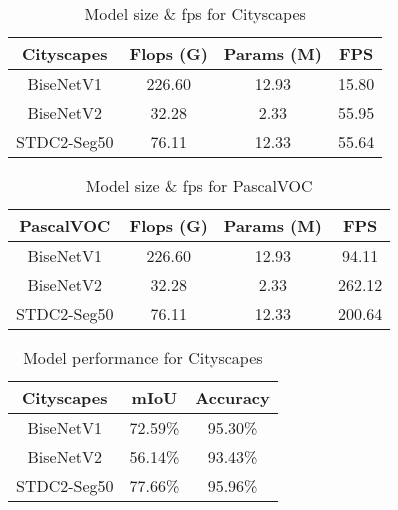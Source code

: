 \begin{table}[]
\centering
\begin{tabular}{cccc}
\hline
{\textbf{Cityscapes}}   & Flops (G)     & Params (M)    & FPS           \\ \hline
{BiseNetV1}             & 226.60        & 12.93         & 15.80         \\ \hline
{BiseNetV2}             & 32.28         & 2.33          & 55.95         \\ \hline
{STDC2-Seg50}           & 76.11         & 12.33         & 55.64         \\ \hline

\end{tabular}
\caption{Model size \& fps for Cityscapes}
\label{tab:parametersSTDC2}
\end{table}

\begin{table}[]
\centering
\begin{tabular}{cccc}
\hline
{\textbf{PascalVOC}}    & Flops (G)     & Params (M)    & FPS           \\ \hline
{BiseNetV1}             & 226.60        & 12.93         & 94.11         \\ \hline
{BiseNetV2}             & 32.28         & 2.33          & 262.12        \\ \hline
{STDC2-Seg50}           & 76.11         & 12.33         & 200.64        \\ \hline

\end{tabular}
\caption{Model size \& fps for PascalVOC}
\label{tab:parametersSTDC2}
\end{table}

\begin{table}[]
\centering
\begin{tabular}{ccc}
\hline
{\textbf{Cityscapes}}   & mIoU          & Accuracy                      \\ \hline
{BiseNetV1}             & 72.59\%       & 95.30\%                       \\ \hline
{BiseNetV2}             & 56.14\%       & 93.43\%                       \\ \hline
{STDC2-Seg50}           & 77.66\%       & 95.96\%                       \\ \hline

\end{tabular}
\caption{Model performance for Cityscapes}
\label{tab:parametersSTDC2}
\end{table}


